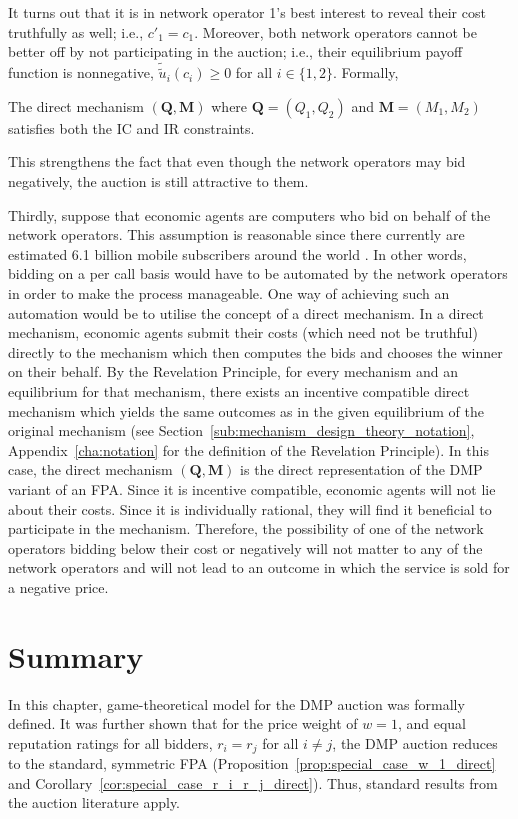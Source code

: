 It turns out that it is in network operator 1's best interest to reveal their cost truthfully as well; i.e., $c'_1=c_1$. Moreover, both network operators cannot be better off by not participating in the auction; i.e., their equilibrium payoff function is nonnegative, $\tilde{\tilde{u}}_i(c_i)\ge 0$ for all $i\in\{1,2\}$. Formally,
\begin{proposition}
\label{prop:pcomp_direct_mechanism_direct}
The direct mechanism $(\mathbf{Q},\mathbf{M})$ where $\mathbf{Q}=(Q_1,Q_2)$ and $\mathbf{M}=(M_1,M_2)$ satisfies both the IC and IR constraints.
\end{proposition}
\noindent This strengthens the fact that even though the network operators may bid negatively, the auction is still attractive to them.

Thirdly, suppose that economic agents are computers who bid on behalf of the network operators. This assumption is reasonable since there currently are estimated 6.1 billion mobile subscribers around the world \cite{Ericsson2011}. In other words, bidding on a per call basis would have to be automated by the network operators in order to make the process manageable. One way of achieving such an automation would be to utilise the concept of a direct mechanism. In a direct mechanism, economic agents submit their costs (which need not be truthful) directly to the mechanism which then computes the bids and chooses the winner on their behalf. By the Revelation Principle, for every mechanism and an equilibrium for that mechanism, there exists an incentive compatible direct mechanism which yields the same outcomes as in the given equilibrium of the original mechanism (see Section~\ref{sub:mechanism_design_theory_notation}, Appendix~\ref{cha:notation} for the definition of the Revelation Principle). In this case, the direct mechanism $(\mathbf{Q},\mathbf{M})$ is the direct representation of the DMP variant of an FPA. Since it is incentive compatible, economic agents will not lie about their costs. Since it is individually rational, they will find it beneficial to participate in the mechanism. Therefore, the possibility of one of the network operators bidding below their cost or negatively will not matter to any of the network operators and will not lead to an outcome in which the service is sold for a negative price.

\section{Summary} %
\label{sec:summary_direct}
In this chapter, game-theoretical model for the DMP auction was formally defined. It was further shown that for the price weight of $w=1$, and equal reputation ratings for all bidders, $r_i=r_j$ for all $i\neq j$, the DMP auction reduces to the standard, symmetric FPA (Proposition~\ref{prop:special_case_w_1_direct} and Corollary~\ref{cor:special_case_r_i_r_j_direct}). Thus, standard results from the auction literature apply.

